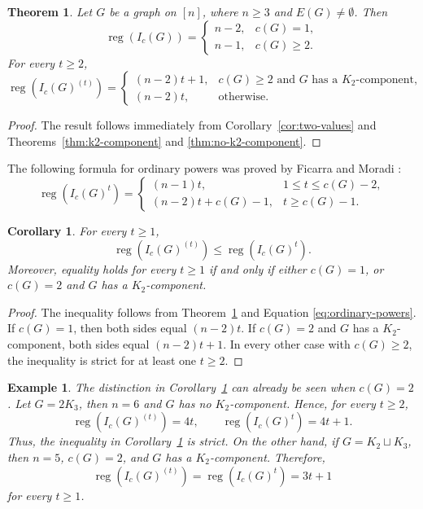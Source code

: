 \documentclass[12pt]{amsart}
\newtheorem{corollary}[proposition]{Corollary}
\newtheorem{theorem}[proposition]{Theorem}
\newtheorem{example}[proposition]{Example}
\DeclareMathOperator{\reg}{reg}
\newcommand{\cI}{I_c}
\begin{document}
\begin{theorem} \label{thm:main-symbolic-regularity}
Let \(G\) be a graph on \([n]\), where \(n\ge3\) and
\(E(G)\ne\emptyset\). Then
\[
\reg(I_c(G))
=
\begin{cases}
n-2, & c(G)=1,\\
n-1, & c(G)\ge2.
\end{cases}
\]
For every \(t\ge2\),
\[
\reg(I_c(G)^{(t)})
=
\begin{cases}
(n-2)t+1,
& c(G)\ge2 \text{ and \(G\) has a \(K_2\)-component},\\
(n-2)t,
& \text{otherwise}.
\end{cases}
\]
\end{theorem}

\begin{proof}
The result follows immediately from Corollary~\ref{cor:two-values} and Theorems~\ref{thm:k2-component} and \ref{thm:no-k2-component}.
\end{proof}

The following formula for ordinary powers was proved by Ficarra and Moradi \cite[Theorem~4.1]{fm25}:
\begin{equation}\label{eq:ordinary-powers}
\reg(\cI(G)^t)=
\begin{cases}
(n-1)t, & 1\le t\le c(G)-2,\\
(n-2)t+c(G)-1, & t\ge c(G)-1.
\end{cases}
\end{equation}


\begin{corollary}\label{cor:symbolic-ordinary-comparison}
For every $t\ge1$,
\[
\reg(I_c(G)^{(t)})\le\reg(I_c(G)^t).
\]
Moreover, equality holds for every $t\ge1$ if and only if either $c(G)=1$, or $c(G)=2$ and $G$ has a $K_2$-component.
\end{corollary}

\begin{proof}
The inequality follows from Theorem~\ref{thm:main-symbolic-regularity} and Equation \eqref{eq:ordinary-powers}. If $c(G)=1$, then both sides equal $(n-2)t$. If $c(G)=2$ and $G$ has a $K_2$-component, both sides equal $(n-2)t+1$. In every other case with $c(G)\ge2$, the inequality is strict for at least one $t\ge2$.
\end{proof}

\begin{example}
The distinction in Corollary~\ref{cor:symbolic-ordinary-comparison}
can already be seen when \(c(G)=2\). Let \(G=2K_3\), then \(n=6\) and
\(G\) has no \(K_2\)-component. Hence, for every \(t\ge2\),
\[
\reg(I_c(G)^{(t)})=4t,
\qquad
\reg(I_c(G)^t)=4t+1.
\]
Thus, the inequality in Corollary~\ref{cor:symbolic-ordinary-comparison} is strict. On the other hand, if \(G=K_2\sqcup K_3\), then \(n=5\),
\(c(G)=2\), and \(G\) has a \(K_2\)-component. Therefore,
\[
\reg(I_c(G)^{(t)})
=
\reg(I_c(G)^t)
=
3t+1
\]
for every \(t\ge1\).
\end{example}
\end{document}
